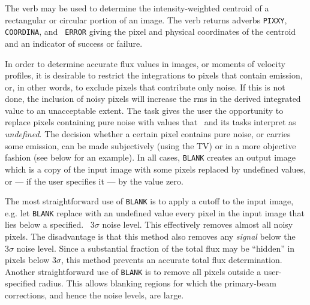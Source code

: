      The verb {\tt {}} may be used to determine the
intensity-weighted centroid of a rectangular or circular portion of an
image.  The verb returns adverbs {\tt PIXXY}, {\tt COORDINA}, and {\tt
ERROR} giving the pixel and physical coordinates of the centroid and
an indicator of success or failure.


In order to determine accurate flux values in images, or moments of
velocity profiles, it is desirable to restrict the integrations to
pixels that contain emission, or, in other words, to exclude pixels
that contribute only noise. If this is not done, the inclusion of
noisy pixels will increase the rms in the derived integrated value to
an unacceptable extent. The task {\tt {}} gives the user the
opportunity to replace pixels containing pure noise with values that
\AIPS\ and its tasks interpret as {\it undefined\/}. The decision
whether a certain pixel contains pure noise, or carries some emission,
can be made subjectively (using the TV) or in a more objective fashion
(see below for an example). In all cases, {\tt BLANK} creates an
output image which is a copy of the input image with some pixels
replaced by undefined values, or --- if the user specifies it --- by
the value zero.

The most straightforward use of {\tt BLANK} is to apply a cutoff to
the input image, e.g. let {\tt BLANK} replace with an undefined value
every pixel in the input image that lies below a specified. \eg\
$3\sigma$ noise level. This effectively removes almost all noisy
pixels. The disadvantage is that this method also removes any {\it
signal} below the $3\sigma$ noise level. Since a substantial fraction
of the total flux may be ``hidden'' in pixels below $3\sigma$, this
method prevents an accurate total flux determination.  Another
straightforward use of {\tt BLANK} is to remove all pixels outside a
user-specified radius.  This allows blanking regions for which the
primary-beam corrections, and hence the noise levels, are large.

